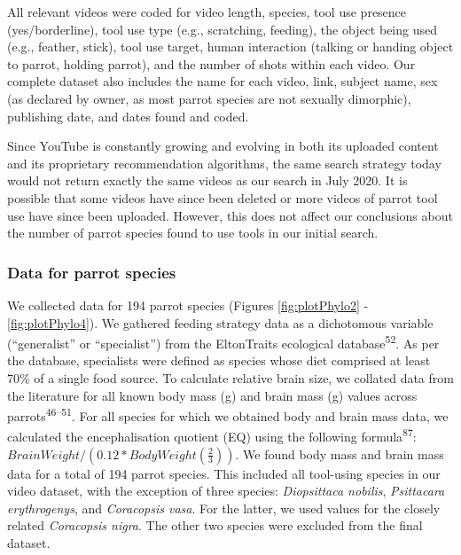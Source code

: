\documentclass[
  man, donotrepeattitle,floatsintext]{apa6}
\begin{document}
All relevant videos were coded for video length, species, tool use presence
(yes/borderline), tool use type (e.g., scratching, feeding), the object being
used (e.g., feather, stick), tool use target, human interaction
(talking or handing object to parrot, holding parrot), and the number of shots
within each video. Our complete dataset also includes the name for each video,
link, subject name, sex (as declared by owner, as most parrot species are not
sexually dimorphic), publishing date, and dates found and coded.

Since YouTube is constantly growing and evolving in both its uploaded content
and its proprietary recommendation algorithms, the same search strategy today
would not return exactly the same videos as our search in July 2020. It is
possible that some videos have since been deleted or more videos of parrot tool
use have since been uploaded. However, this does not affect our conclusions
about the number of parrot species found to use tools in our initial search.

\hypertarget{data-for-parrot-species}{%
\subsubsection{Data for parrot species}\label{data-for-parrot-species}}

We collected data for 194 parrot species (Figures
\ref{fig:plotPhylo2} - \ref{fig:plotPhylo4}). We gathered feeding strategy
data as a dichotomous variable (``generalist'' or ``specialist'') from the
EltonTraits ecological database\textsuperscript{52}. As per the database, specialists
were defined as species whose diet comprised at least 70\% of a single food
source. To calculate relative brain size, we collated data from the literature
for all known body mass (g) and brain mass (g) values across
parrots\textsuperscript{46--51}. For all species for which we obtained body and brain mass data, we
calculated the encephalisation quotient (EQ) using the following
formula\textsuperscript{87}: \(BrainWeight / (0.12 * BodyWeight(\frac{2}{3}))\). We
found body mass and brain mass data for a total of 194 parrot species. This
included all tool-using species in our video dataset, with the exception of
three species: \emph{Diopsittaca nobilis}, \emph{Psittacara erythrogenys}, and \emph{Coracopsis
vasa}. For the latter, we used values for the closely related \emph{Coracopsis
nigra}. The other two species were excluded from the final dataset.
\end{document}
